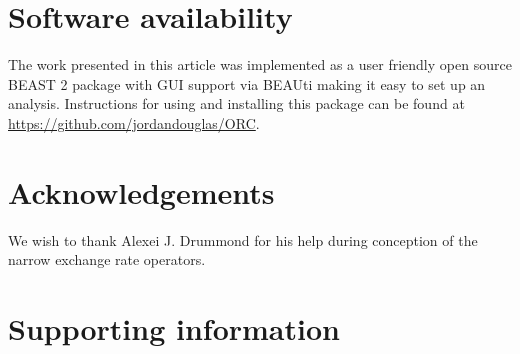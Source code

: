\documentclass[10pt,letterpaper]{article}
\begin{document}


\section*{Software availability}

The work presented in this article was implemented as a user friendly open source BEAST 2 package with GUI support via BEAUti making it easy to set up an analysis. Instructions for using and installing this package can be found at \href{https://github.com/jordandouglas/ORC}{https://github.com/jordandouglas/ORC}.



\section*{Acknowledgements}

We wish to thank Alexei J. Drummond for his help during conception of the narrow exchange rate operators.



\section*{Supporting information}
\end{document}
